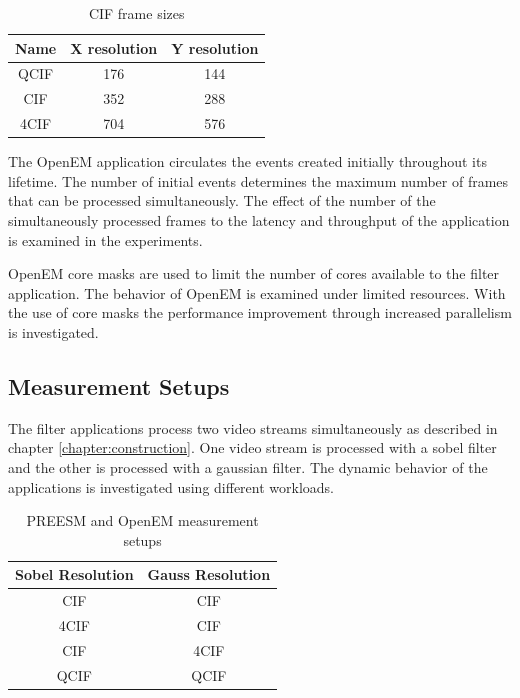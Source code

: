 \begin{table}
    \begin{center}
        \begin{tabular}{ c c c }
            Name  & X resolution  & Y resolution \\ \hline
            QCIF  & 176           & 144          \\ \hline
            CIF   & 352           & 288          \\ \hline
            4CIF  & 704           & 576          \\ \hline
        \end{tabular}
        \caption{CIF frame sizes}
        \label{tab:cif_frames}
    \end{center}
\end{table}

The OpenEM application circulates the events created initially throughout its lifetime. The number of initial events determines the maximum number of frames that can be processed simultaneously. The effect of the number of the simultaneously processed frames to the latency and throughput of the application is examined in the experiments.

OpenEM core masks are used to limit the number of cores available to the filter application. The behavior of OpenEM is examined under limited resources. With the use of core masks the performance improvement through increased parallelism is investigated.

\subsection{Measurement Setups}
\label{subsec:measurement-setups}
The filter applications process two video streams simultaneously as described in chapter \ref{chapter:construction}. One video stream is processed with a sobel filter and the other is processed with a gaussian filter. The dynamic behavior of the applications is investigated using different workloads.

\begin{table}
    \begin{center}
        \begin{tabular}{ c c }
            Sobel Resolution & Gauss Resolution \\ \hline
            CIF              & CIF              \\ \hline
            4CIF             & CIF              \\ \hline
            CIF              & 4CIF             \\ \hline
            QCIF             & QCIF             \\ \hline
        \end{tabular}
        \caption{PREESM and OpenEM measurement setups}
        \label{tab:preesm_setups}
    \end{center}
\end{table}

